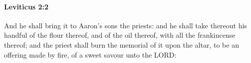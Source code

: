 
		\paragraph{Leviticus 2:2} %
			\label{LEVITICUS-2-2}

			And he shall bring it to Aaron’s sons the priests: and he shall take thereout his handful of the flour thereof, and of the oil thereof, with all the frankincense thereof; and the priest shall burn the memorial of it upon the altar, to be an offering made by fire, of a sweet savour unto the LORD:



